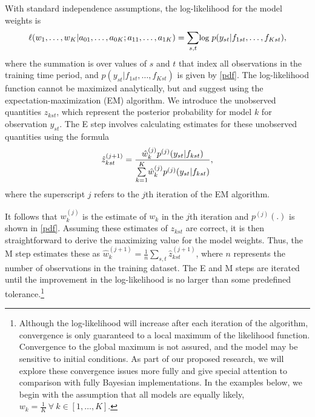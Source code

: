 \documentclass[pdftex,12pt,fullpage,oneside]{amsart}
\begin{document}
With standard independence assumptions, the log-likelihood for the
model weights is
\begin{equation}
\small
  \ell (w_1, \ldots, w_K | a_{01},  \ldots, a_{0K}; a_{11},
  \ldots, a_{1K})= \underset{s,t}{\sum}\mbox{log }p(y_{st} |
  f_{1st}, \ldots, f_{Kst}),
\end{equation}
\noindent where the summation is over values of $s$ and $t$ that index
all observations in the training time period, and $p(y_{st}|f_{1st},
\ldots, f_{Kst}) $ is given by \eqref{pdf}. The log-likelihood
function cannot be maximized analytically, but \citet{Raftery:2005}
and \citet{Sloughter:2007} suggest using the expectation-maximization
(EM) algorithm.  We introduce the unobserved quantities $z_{kst}$,
which represent the posterior probability for model $k$ for
observation $y_{st}$.  The E step involves calculating estimates for
these unobserved quantities using the formula
\begin{equation}
\small
\hat{z}^{(j+1)}_{kst} = \frac{\hat{w}^{(j)}_k
p^{(j)}(y_{st}|f_{kst})}{\overset{K}{\underset{k=1}{\sum}}\hat{w}^{(j)}_kp^{(j)}(y_{st}|f_{kst})},
\end{equation}
\noindent where the superscript $j$ refers to the $j$th iteration of
the EM algorithm.


It follows that $w_k^{(j)}$ is the estimate of $w_k$ in the $j$th
iteration and $p^{(j)}(.)$ is shown in \eqref{pdf}.  Assuming these
estimates of $z_{kst}$ are correct, it is then straightforward to
derive the maximizing value for the model weights. Thus, the M step
estimates these as
$\hat{w}^{(j+1)}_k=\frac{1}{n}\underset{s,t}{\sum}\hat{z}^{(j+1)}_{kst}$,
where $n$ represents the number of observations in the training
dataset.  The E and M steps are iterated until the improvement in the
log-likelihood is no larger than some predefined
tolerance.\footnote{Although the log-likelihood will increase after
  each iteration of the algorithm, convergence is only guaranteed to a
  local maximum of the likelihood function.  Convergence to the global
  maximum is not assured, and the model may be sensitive to initial
  conditions. As part of our proposed research, we will explore these
  convergence issues more fully and give special attention to
  comparison with fully Bayesian implementations. In the examples
  below, we begin with the assumption that all models are equally
  likely, $w_k = \frac{1}{K} ~ \forall ~ k \in [1, \ldots, K]$.}


\end{document}
